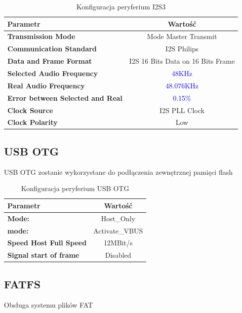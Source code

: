 \documentclass[10pt, a4paper]{article}
\begin{document}
\begin{table}[H]
	\centering
	\begin{tabular}{|l|c|} \hline
		\textbf{Parametr} & Wartość \\
		\hline
		\hline  \textbf{Transmission Mode}& Mode Master Transmit \\ 
		\hline  \textbf{Communication Standard} & I2S Philips \\
		\hline  \textbf{Data and Frame Format} & I2S 16 Bits Data on 16 Bits Frame \\
		\hline  \textbf{Selected Audio Frequency} & \textcolor{blue}{48KHz }\\
		\hline  \textbf{Real Audio Frequency} & \textcolor{blue}{48.076KHz} \\
		\hline  \textbf{Error between Selected and Real} & \textcolor{blue}{0.15{\%}}
		\\
	\hline  \textbf{Clock Source} & I2S PLL Clock  \\
	\hline  \textbf{Clock Polarity} & Low \\
	\hline

	\end{tabular}
	\caption{Konfiguracja peryferium I2S3}
	\label{tab:USART}
\end{table}



\subsection{USB OTG}

USB OTG zostanie wykorzystane do podłączenia zewnętrznej pamięci flash

\begin{table}[H]
	\centering
	\begin{tabular}{|l|c|} \hline
		\textbf{Parametr} & Wartość \\
		\hline
\hline  \textbf{Mode:} &Host{\_}Only\\
\hline  \textbf{mode:} &Activate{\_}VBUS \\
\hline  \textbf{Speed Host Full Speed} &12MBit/s\\
\hline  \textbf{Signal start of frame} &Disabled\\
 \hline 
	\end{tabular}
	\caption{Konfiguracja peryferium USB OTG}
	\label{tab:USART}
\end{table}
\newpage
\subsection{FATFS}
 Obsługa systemu plików FAT
\end{document}
